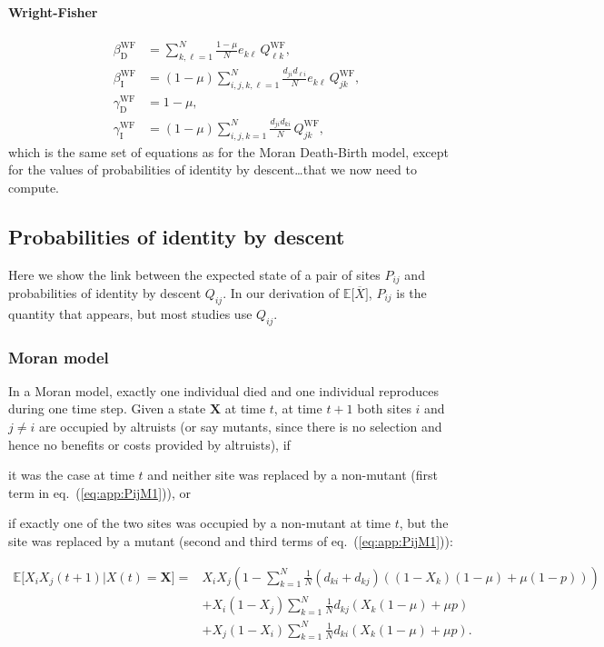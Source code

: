 \documentclass[11pt, letterpaper]{article}
\renewcommand{\eqref}[1]{\textup{{\normalfont eq.~(\ref{#1}}\normalfont)}}
\newcommand{\Esp}[1]{\mathbb{E}\big[ #1\big]}%
\newcommand{\direct}{\mathrm{D}}
\newcommand{\indirect}{\mathrm{I}}
\newcommand{\WF}{\textrm{WF}}
\begin{document}
\paragraph{Wright-Fisher}
\begin{subequations}
\begin{align}
\beta_{\direct}^{\WF} &= \sum_{k,\ell=1}^N \frac{1-\mu}{N} e_{k\ell} \, Q_{\ell k}^{\WF},\\
%
\beta_{\indirect}^{\WF} &= (1-\mu) \sum_{i,j,k,\ell=1}^{N} \frac{ d_{ji} d_{\ell i}}{N}   e_{k\ell} \, Q_{jk}^{\WF}, \\ 
%
\gamma_{\direct}^{\WF} &= 1-\mu,\\
%
\gamma_{\indirect}^{\WF} &= (1-\mu)\sum_{i,j,k=1}^N  \frac{ d_{ji} d_{ki}}{N }  \, Q_{jk}^{\WF},
\end{align}
\end{subequations}
which is the same set of equations as for the Moran Death-Birth model, except for the values of probabilities of identity by descent\dots that we now need to compute.  

\subsection{Probabilities of identity by descent\label{sec:app:IBD}}

Here we show the link between the expected state of a pair of sites $P_{ij}$ and probabilities of identity by descent $Q_{ij}$. In our derivation of $\Esp{\overline{X}}$, $P_{ij}$ is the quantity that appears, but most studies use $Q_{ij}$. 

\subsubsection{Moran model}
In a Moran model, exactly one individual died and one individual reproduces during one time step. Given a state $\mathbf{X}$ at time $t$, at time $t+1$ both sites $i$ and $j\neq i$ are occupied by altruists (or say mutants, since there is no selection and hence no benefits or costs provided by altruists), if \begin{inparaenum}[\it i\rm)]\item it was the case at time $t$ and neither site was replaced by a non-mutant (first term in \eqref{eq:app:PijM1}), or \item if exactly one of the two sites was occupied by a non-mutant at time $t$, but the site was replaced by a mutant (second and third terms of \eqref{eq:app:PijM1}): \end{inparaenum}
%
\begin{align}\label{eq:app:PijM1}
 \Esp{X_iX_j(t+1)|X(t)=\mathbf{X}} = & X_i X_j \left(1 - \sum_{k=1}^N \frac{1}{N} \left( d_{ki} + d_{kj} \right) \left( (1-X_k) (1-\mu) + \mu (1-p)\right) \right) \nonumber \\
  &+ X_i (1-X_j) \sum_{k=1}^N \frac{1}{N} d_{kj} \left( X_k (1-\mu) + \mu p \right)  \\
& + X_j (1-X_i) \sum_{k=1}^N \frac{1}{N} d_{ki} \left( X_k (1-\mu) + \mu p \right). \nonumber
\end{align}
\end{document}
